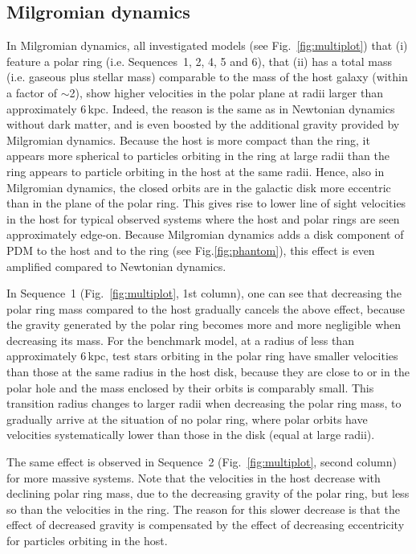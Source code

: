 \documentclass[useAMS,usenatbib]{mn2e}
\begin{document}
\subsection{Milgromian dynamics}
In Milgromian dynamics, all investigated models (see Fig.~\ref{fig:multiplot}) that (i) feature a polar ring (i.e. Sequences~1, 2, 4, 5 and 6), that (ii) has a total mass (i.e. gaseous plus stellar mass) comparable to the mass of the host galaxy (within a factor of $\sim$2), show higher velocities in the polar plane at radii larger than approximately 6\,kpc. Indeed, the reason is the same as in Newtonian dynamics without dark matter, and is even boosted by the additional gravity provided by Milgromian dynamics. Because the host is more compact than the ring, it appears more spherical to particles orbiting in the ring at large radii than the ring appears to particle orbiting in the host at the same radii. Hence, also in Milgromian dynamics, the closed orbits are in the galactic disk more eccentric than in the plane of the polar ring. This gives rise to lower line of sight velocities in the host for typical observed systems where the host and polar rings are seen approximately edge-on. Because Milgromian dynamics adds a disk component of PDM to the host and to the ring (see Fig.\ref{fig:phantom}), this effect is even amplified compared to Newtonian dynamics.

In Sequence~1 (Fig.~\ref{fig:multiplot}, 1st column), one can see that decreasing the polar ring mass compared to the host gradually cancels the above effect, because the gravity generated by the polar ring becomes more and more negligible when decreasing its mass. For the benchmark model, at a radius of less than approximately 6\,kpc, test stars orbiting in the polar ring have smaller velocities than those at the same radius in the host disk, because they are close to or in the polar hole and the mass enclosed by their orbits is comparably small. This transition radius changes to larger radii when decreasing the polar ring mass, to gradually arrive at the situation of no polar ring, where polar orbits have velocities systematically lower than those in the disk (equal at large radii).

The same effect is observed in Sequence~2 (Fig.~\ref{fig:multiplot}, second column) for more massive systems. Note that the velocities in the host decrease with declining polar ring mass, due to the decreasing gravity of the polar ring, but less so than the velocities in the ring. The reason for this slower decrease is that the effect of decreased gravity is compensated by the effect of decreasing eccentricity for particles orbiting in the host.
\end{document}

